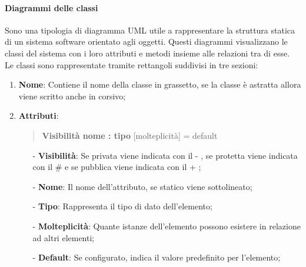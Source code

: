 \documentclass[10pt]{article}
\begin{document}
\begin{justify}
        \paragraph{Diagrammi delle classi}
        Sono una tipologia di diagramma UML utile a rappresentare la struttura statica di un sistema software orientato agli oggetti. Questi diagrammi visualizzano le classi del sistema con i loro attributi e metodi insieme alle relazioni tra di esse.\\
        Le classi sono rappresentate tramite rettangoli suddivisi in tre sezioni:
        \begin{enumerate}
            \item \textbf{Nome}: Contiene il nome della classe in grassetto, se la classe è astratta allora viene scritto anche in corsivo;
            \item \textbf{Attributi}:
            \begin{quote}
                \textbf{Visibilità nome : tipo} [molteplicità] = default
            \end{quote}
            \begin{itemize}
                \item [-] \textbf{Visibilità}: Se privata viene indicata con il - , se protetta viene indicata con il \# e se pubblica viene indicata con il + ;
                \item [-] \textbf{Nome}: Il nome dell'attributo, se statico viene sottolineato;
                \item [-] \textbf{Tipo}: Rappresenta il tipo di dato dell'elemento;
                \item [-] \textbf{Molteplicità}: Quante istanze dell'elemento possono esistere in relazione ad altri elementi;
                \item [-] \textbf{Default}: Se configurato, indica il valore predefinito per l'elemento;
            \end{itemize}


\end{enumerate}
\end{justify}
\end{document}
